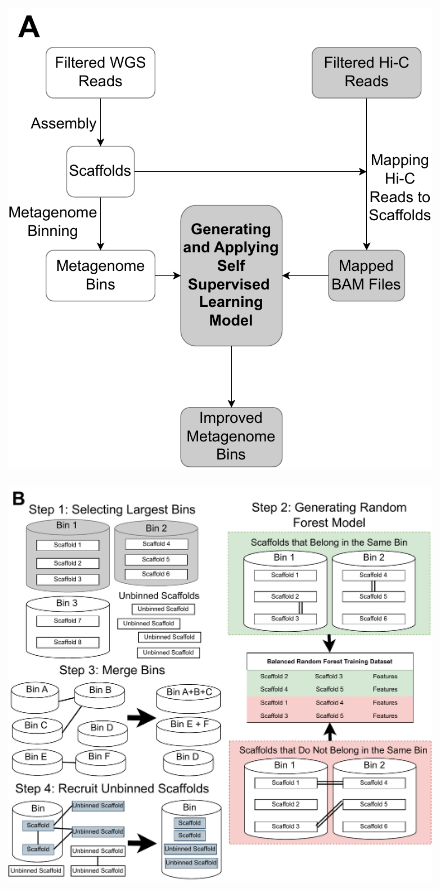 \documentclass[fleqn,10pt,lineno]{wlpeerj}
\begin{document}
\begin{figure}
    \centering
    \begin{minipage}[b]{0.40\textwidth}
        \centering
        \includegraphics[width=\textwidth]{Strategy_Diagram_12.1.drawio.pdf}
        \label{fig:sub1}
    \end{minipage}
    \begin{minipage}[b]{0.75\textwidth}
        \centering
        \includegraphics[width=\textwidth]{Strategy_Diagram_12.2.6.drawio.pdf}

\end{minipage}
\end{figure}
\end{document}
